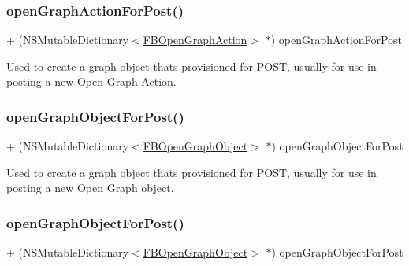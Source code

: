 \subsubsection{\texorpdfstring{open\+Graph\+Action\+For\+Post()}{openGraphActionForPost()}\hspace{0.1cm}{\footnotesize\ttfamily [5/5]}}
{\footnotesize\ttfamily + (N\+S\+Mutable\+Dictionary$<$\hyperlink{protocolFBOpenGraphAction-p}{F\+B\+Open\+Graph\+Action}$>$ $\ast$) open\+Graph\+Action\+For\+Post \begin{DoxyParamCaption}{ }\end{DoxyParamCaption}}

Used to create a graph object that\textquotesingle{}s provisioned for P\+O\+ST, usually for use in posting a new Open Graph \hyperlink{classAction}{Action}. \mbox{\label{interfaceFBGraphObject_a79fab85a97be10dc0d5bf6febcc848f4}} 
\subsubsection{\texorpdfstring{open\+Graph\+Object\+For\+Post()}{openGraphObjectForPost()}\hspace{0.1cm}{\footnotesize\ttfamily [1/5]}}
{\footnotesize\ttfamily + (N\+S\+Mutable\+Dictionary$<$\hyperlink{protocolFBOpenGraphObject-p}{F\+B\+Open\+Graph\+Object}$>$ $\ast$) open\+Graph\+Object\+For\+Post \begin{DoxyParamCaption}{ }\end{DoxyParamCaption}}

Used to create a graph object that\textquotesingle{}s provisioned for P\+O\+ST, usually for use in posting a new Open Graph object. \mbox{\label{interfaceFBGraphObject_a79fab85a97be10dc0d5bf6febcc848f4}} 
\subsubsection{\texorpdfstring{open\+Graph\+Object\+For\+Post()}{openGraphObjectForPost()}\hspace{0.1cm}{\footnotesize\ttfamily [2/5]}}
{\footnotesize\ttfamily + (N\+S\+Mutable\+Dictionary$<$\hyperlink{protocolFBOpenGraphObject-p}{F\+B\+Open\+Graph\+Object}$>$ $\ast$) open\+Graph\+Object\+For\+Post \begin{DoxyParamCaption}{ }\end{DoxyParamCaption}}

